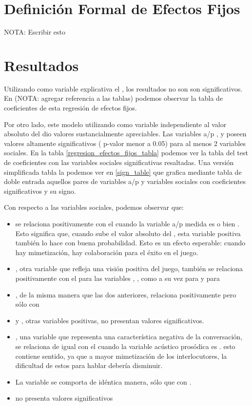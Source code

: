 \section{Definición Formal de Efectos Fijos}

NOTA: Escribir esto

\section{Resultados}

Utilizando como variable explicativa el \entrainment, los resultados no son son significativos. En (NOTA: agregar referencia a las tablas) podemos observar la tabla de coeficientes de esta regresión de efectos fijos.

Por otro lado, este modelo utilizando como variable independiente al valor absoluto del \entrainment dio valores sustancialmente apreciables. Las variables a/p \ENGMAX, \FOMEAN y \NOISETOHARMONICS poseen valores altamente significativos ( p-valor menor a 0.05) para al menos 2 variables sociales. En la tabla \ref{regresion_efectos_fijos_tabla} podemos ver la tabla del test de coeficientes con las variables sociales significativas resaltadas. Una versión simplificada tabla la podemos ver en \ref{sign_table} que grafica mediante tabla de doble entrada aquellos pares de variables a/p y variables sociales con coeficientes significativos y su signo.

Con respecto a las variables sociales, podemos observar que:

\begin{itemize}
  \item \svcontributes se relaciona positivamente con el \absentrainment cuando la variable a/p medida es \FOMEAN o bien \NOISETOHARMONICS. Esto significa que, cuando sube el valor absoluto del \entrainment, esta variable positiva también lo hace con buena probabilidad. Esto es un efecto esperable: cuando hay mimetización, hay colaboración para el éxito en el juego.
  \item \svclear, otra variable que refleja una visión positiva del juego, también se relaciona positivamente con el \absentrainment para las variables \FOMEAN, \NOISETOHARMONICS, \ENGMAX como a su vez para \PHONAVG y para \SYLCOUNT
  \item \svengaged, de la misma manera que las dos anteriores, relaciona positivamente pero sólo con \FOMEAN
  \item \svplanning y \svencourages, otras variables positivas, no presentan valores significativos.
  \item \svdifficult, una variable que representa una característica negativa de la conversación, se relaciona de igual con el \absentrainment cuando la variable acústico prosódica es \ENGMAX. esto contiene sentido, ya que a mayor mimetización de los interlocutores, la dificultad de estos para hablar debería disminuir.
  \item La variable \svbored se comporta de idéntica manera, sólo que con \FOMEAN.
  \item \svdislikes no presenta valores significativos
\end{itemize}



